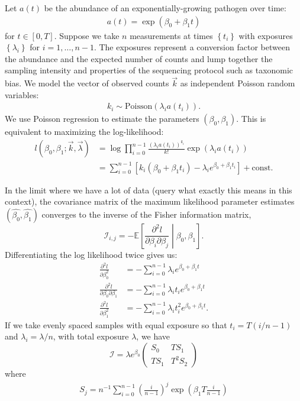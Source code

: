 \documentclass[12pt, letterpaper]{article}
\begin{document}
Let $a(t)$ be the abundance of an exponentially-growing pathogen over time:
\begin{align}
    a(t) = \exp(\beta_0 + \beta_1 t)
\end{align}
for $t \in \left[ 0, T\right]$.
Suppose we take $n$ measurements at times $\left\{t_i\right\}$ with exposures $\left\{\lambda_i\right\}$ for $i = 1, \ldots, n-1$.
The exposures represent a conversion factor between the abundance and the expected number of counts and lump together the sampling intensity and properties of the sequencing protocol such as taxonomic bias.
We model the vector of observed counts $\vec{k}$ as independent Poisson random variables:
\begin{align}
    k_i \sim \text{Poisson}(\lambda_i a(t_i)).
\end{align}
We use Poisson regression to estimate the parameters $(\beta_0, \beta_1)$.
This is equivalent to maximizing the log-likelihood:
\begin{align}
    l(\beta_0, \beta_1; \vec{k}, \vec{\lambda})
    & = \log \prod_{i=0}^{n-1} \frac{{(\lambda_i a(t_i))}^{k_i}}{k!} \exp(\lambda_i a(t_i))\\
    & = \sum_{i=0}^{n-1} \left[k_i(\beta_0 + \beta_1 t_i) - \lambda_i e^{\beta_0 + \beta_1 t_i} \right] + \text{const.}
\end{align}

In the limit where we have a lot of data (query what exactly this means in this context), the covariance matrix of the maximum likelihood parameter estimates $(\hat{\beta_0}, \hat{\beta_1})$ converges to the inverse of the Fisher information matrix,
\begin{equation}
    \mathcal{I}_{i, j} = - \mathbb{E} \left[ \frac{\partial^2 l}{\partial \beta_i \partial \beta_j} \middle| \beta_0, \beta_1 \right].
\end{equation}
Differentiating the log likelihood twice gives us:
\begin{align}
    \frac{\partial^2 l}{\partial \beta_0^2}
    &= - \sum_{i=0}^{n-1} \lambda_i e^{\beta_0 + \beta_1 t} \\
    \frac{\partial^2 l}{\partial \beta_0 \partial \beta_1}
    &= - \sum_{i=0}^{n-1} \lambda_i t_i e^{\beta_0 + \beta_1 t} \\
    \frac{\partial^2 l}{\partial \beta_1^2}
    &= - \sum_{i=0}^{n-1} \lambda_i t_i^2 e^{\beta_0 + \beta_1 t}.
\end{align}
If we take evenly spaced samples with equal exposure so that $t_i = T(i/n-1)$ and $\lambda_i = \lambda / n$, with total exposure $\lambda$, we have
\begin{equation}
    \mathcal{I} = \lambda e^{\beta_0}
    \begin{pmatrix}
        S_0 & T S_1 \\
        T S_1 & T^2 S_2
    \end{pmatrix}
\end{equation}
where
\begin{align}
    S_j = n^{-1} \sum_{i=0}^{n-1} {\left(\frac{i}{n-1}\right)}^j \exp\left(\beta_1 T \frac{i}{n-1}\right)
\end{align}
\end{document}
